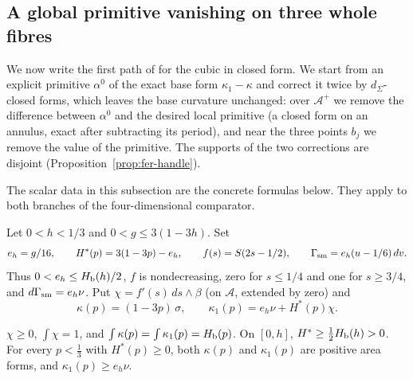 \subsection{A global primitive vanishing on three whole fibres}\label{sec:fer-alpha1}

We now write the first path of  for the cubic in closed form. We start from an explicit
primitive $\alpha^0$ of the exact base form $\kappa_1-\kappa$ and correct it twice by $d_\Sigma$-closed forms, which leaves the base
curvature unchanged: over $\mathcal A^+$ we remove the difference between $\alpha^0$ and the desired local primitive (a closed
form on an annulus, exact after subtracting its period), and near the three points $b_j$ we remove the value of the
primitive. The supports of the two corrections are disjoint (Proposition~\ref{prop:fer-handle}).

The scalar data in this subsection are the concrete formulas below. They apply to both branches of the four-dimensional comparator.

\begin{definition}\label{def:fer-kappa}
Let $0<h<1/3$ and $0<g\le3(1-3h)$. Set
\[
 e_h=g/16,\qquad H^*(p)=3(1-3p)-e_h,\qquad
 f(s)=S(2s-1/2),\qquad \Gamma_{\rm sm}=e_h(u-1/6)\,dv.
\]
Thus $0<e_h\le H_{\mathrm b}(h)/2$, $f$ is nondecreasing, zero for $s\le1/4$ and one for $s\ge3/4$,
and $d\Gamma_{\rm sm}=e_h\nu$.
Put $\chi=f'(s)\,ds\wedge\beta$ (on $\mathcal A$, extended by zero) and
\[
 \kappa(p)=(1-3p)\,\sigma,\qquad \kappa_1(p)=e_h\nu+H^*(p)\chi .
\]
\end{definition}

\begin{lemma}\label{lem:fer-kappa}
$\chi\ge0$, $\int\chi=1$, and $\int\kappa(p)=\int\kappa_1(p)=H_{\mathrm b}(p)$. On $[0,h]$, $H^*\ge\frac12H_{\mathrm b}(h)>0$. For every $p<\frac13$
with $H^*(p)\ge0$, both $\kappa(p)$ and $\kappa_1(p)$ are positive area forms, and $\kappa_1(p)\ge e_h\nu$.
\end{lemma}

